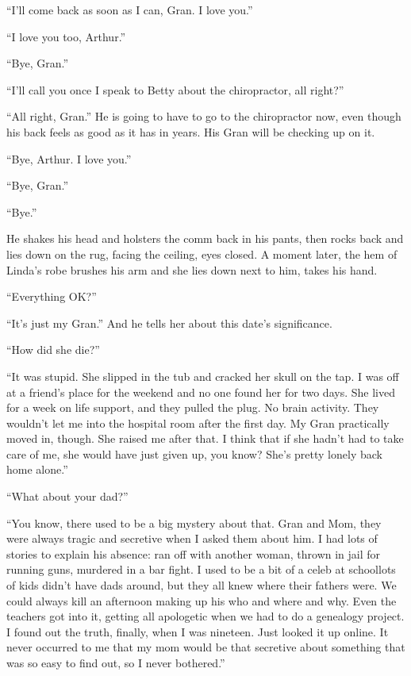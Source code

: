 “I’ll come back as soon as I can, Gran. I love you.”

“I love you too, Arthur.”

“Bye, Gran.”

“I’ll call you once I speak to Betty about the chiropractor, all
right?”

“All right, Gran.” He is going to have to go to the chiropractor
now, even though his back feels as good as it has in years. His
Gran will be checking up on it.

“Bye, Arthur. I love you.”

“Bye, Gran.”

“Bye.”

He shakes his head and holsters the comm back in his pants, then
rocks back and lies down on the rug, facing the ceiling, eyes
closed. A moment later, the hem of Linda’s robe brushes his arm and
she lies down next to him, takes his hand.

“Everything OK?”

“It’s just my Gran.” And he tells her about this date’s
significance.

“How did she die?”

“It was stupid. She slipped in the tub and cracked her skull on the
tap. I was off at a friend’s place for the weekend and no one found
her for two days. She lived for a week on life support, and they
pulled the plug. No brain activity. They wouldn’t let me into the
hospital room after the first day. My Gran practically moved in,
though. She raised me after that. I think that if she hadn’t had to
take care of me, she would have just given up, you know? She’s
pretty lonely back home alone.”

“What about your dad?”

“You know, there used to be a big mystery about that. Gran and Mom,
they were always tragic and secretive when I asked them about him.
I had lots of stories to explain his absence: ran off with another
woman, thrown in jail for running guns, murdered in a bar fight. I
used to be a bit of a celeb at school{\dash}lots of kids didn’t have dads
around, but they all knew where their fathers were. We could always
kill an afternoon making up his who and where and why. Even the
teachers got into it, getting all apologetic when we had to do a
genealogy project. I found out the truth, finally, when I was
nineteen. Just looked it up online. It never occurred to me that my
mom would be that secretive about something that was so easy to
find out, so I never bothered.”

